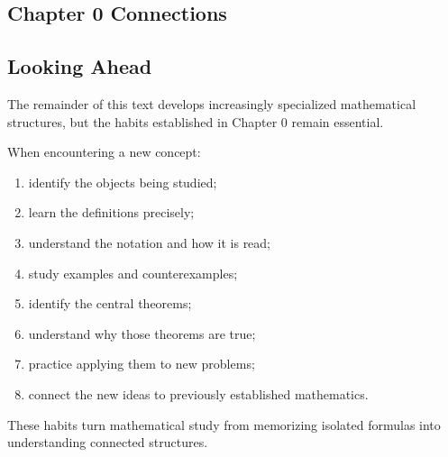 \subsection{Chapter 0 Connections}
\label{subsec:foundations-final-connections}


\subsection{Looking Ahead}
\label{subsec:foundations-looking-ahead}

The remainder of this text develops increasingly specialized mathematical
structures, but the habits established in Chapter 0 remain essential.

When encountering a new concept:

\begin{enumerate}
    \item identify the objects being studied;
    \item learn the definitions precisely;
    \item understand the notation and how it is read;
    \item study examples and counterexamples;
    \item identify the central theorems;
    \item understand why those theorems are true;
    \item practice applying them to new problems;
    \item connect the new ideas to previously established mathematics.
\end{enumerate}

These habits turn mathematical study from memorizing isolated formulas into
understanding connected structures.

